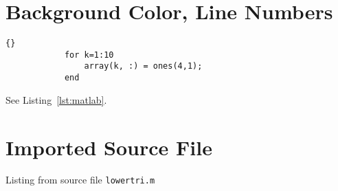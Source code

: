 \documentclass{article}
\begin{document}
\section{Background Color, Line Numbers}

\newcommand{\reg}{$\mbox{}^{\textregistered}$\hspace{1ex}}

\lstset{language=matlab}
\lstset{linewidth=90mm}
\lstset{frameround=tttt}
\begin{center}
    \begin{minipage}{100mm}
        \begin{lstlisting}[frame=trBL,caption=Some MATLAB\reg Code,label=lst:matlab,gobble=4]{}
            for k=1:10
                array(k, :) = ones(4,1);
            end
        \end{lstlisting}
    \end{minipage}
\end{center}

See Listing~\ref{lst:matlab}.


\section{Imported Source File}

Listing from source file \texttt{lowertri.m} \\

\lstset{language=matlab}
\lstset{linewidth=\textwidth}
\lstset{commentstyle=\textit, stringstyle=\upshape,showspaces=false}
\lstset{frame=trBL,frameround=tttt}

\end{document}
